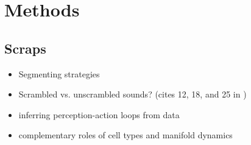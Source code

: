 
% 

\section{Methods}

\subsection{Scraps}


\begin{itemize}
\item Segmenting strategies \cite{ashwoodMiceAlternateDiscrete2020}
\item Scrambled vs. unscrambled sounds? (cites 12, 18, and 25 in \cite{norman-haignereHierarchicalIntegrationMultiple2020})
\item inferring perception-action loops from data \cite{rosasCausalBlanketsTheory2020}
\item complementary roles of cell types and manifold dynamics \cite{dubreuilComplementaryRolesDimensionality2020}
\end{itemize}


% 